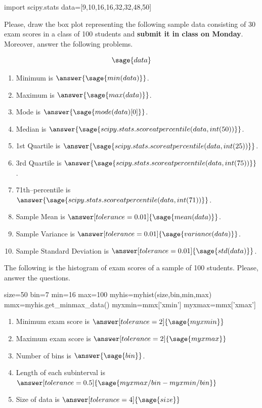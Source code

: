 \documentclass{ximera}
\begin{document}
\begin{problem}
\begin{sagesilent}
import scipy.stats
data=[9,10,16,16,32,32,48,50]
\end{sagesilent}
Please, draw the box plot representing the following sample data consisting of 30 exam scores in a class of 100 students and \textbf{submit it in class on Monday}. Moreover, answer the following problems.

$$\sage{data}$$

\begin{enumerate}
    \item Minimum is $\answer{\sage{min(data)}}$.
    \item Maximum is $\answer{\sage{max(data)}}$.
    \item Mode is $\answer{\sage{mode(data)[0]}}$.
    \item Median is $\answer{\sage{scipy.stats.scoreatpercentile(data,int(50))}}$.
    \item 1st Quartile is $\answer{\sage{scipy.stats.scoreatpercentile(data,int(25))}}$.
    \item 3rd Quartile is $\answer{\sage{scipy.stats.scoreatpercentile(data,int(75))}}$.
    \item 71th--percentile is $\answer{\sage{scipy.stats.scoreatpercentile(data,int(71))}}$.
    \item Sample Mean is $\answer[tolerance=0.01]{\sage{mean(data)}}$.
    \item Sample Variance is $\answer[tolerance=0.01]{\sage{variance(data)}}$.
    \item Sample Standard Deviation is $\answer[tolerance=0.01]{\sage{std(data)}}$.
\end{enumerate}
\end{problem}

\begin{problem}
The following is the histogram of exam scores of a sample of 100 students. Please, answer the questions.

\begin{sagesilent}
size=50
bin=7
min=16
max=100
myhis=myhist(size,bin,min,max)
mmx=myhis.get_minmax_data()
myxmin=mmx['xmin']    
myxmax=mmx['xmax']    
\end{sagesilent}


\begin{enumerate}
    \item Minimum exam score is $\answer[tolerance=2]{\sage{myxmin}}$
    \item Maximum exam score is $\answer[tolerance=2]{\sage{myxmax}}$
    \item Number of bins is $\answer{\sage{bin}}$.
    \item Length of each subinterval is $\answer[tolerance=0.5]{\sage{myxmax/bin-myxmin/bin}}$
    \item Size of data is $\answer[tolerance=4]{\sage{size}}$
\end{enumerate}
\end{problem}
\end{document}
